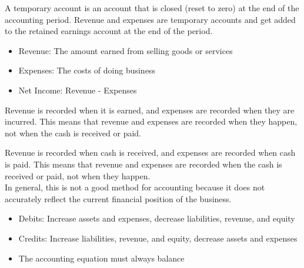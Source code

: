 \begin{proposition}
    A temporary account is an account that is closed (reset to zero) at the end of the accounting period. Revenue and expenses are temporary accounts and get added to the retained earnings account at the end of the period.
\end{proposition}

\begin{proposition}
    \begin{itemize}
        \item Revenue: The amount earned from selling goods or services
        \item Expenses: The costs of doing business
        \item Net Income: Revenue - Expenses
    \end{itemize}
\end{proposition}

\begin{definition}
    Revenue is recorded when it is earned, and expenses are recorded when they are incurred. This means that revenue and expenses are recorded when they happen, not when the cash is received or paid.
\end{definition}

\begin{definition}
    Revenue is recorded when cash is received, and expenses are recorded when cash is paid. This means that revenue and expenses are recorded when the cash is received or paid, not when they happen.\\
    In general, this is not a good method for accounting because it does not accurately reflect the current financial position of the business.
\end{definition}

\begin{definition}
    \begin{itemize}
        \item Debits: Increase assets and expenses, decrease liabilities, revenue, and equity
        \item Credits: Increase liabilities, revenue, and equity, decrease assets and expenses
        \item The accounting equation must always balance
    \end{itemize}
\end{definition}


